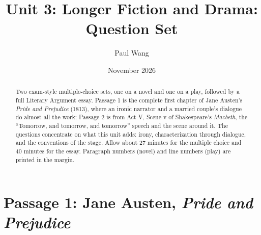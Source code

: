 \documentclass[11pt]{article}
\title{Unit 3: Longer Fiction and Drama: Question Set}
\author{Paul Wang}
\date{November 2026}
\begin{document}
\maketitle

\begin{abstract}
Two exam-style multiple-choice sets, one on a novel and one on a play, followed by a full Literary Argument essay. Passage 1 is the complete first chapter of Jane Austen's \emph{Pride and Prejudice} (1813), where an ironic narrator and a married couple's dialogue do almost all the work; Passage 2 is from Act V, Scene v of Shakespeare's \emph{Macbeth}, the ``Tomorrow, and tomorrow, and tomorrow'' speech and the scene around it. The questions concentrate on what this unit adds: irony, characterization through dialogue, and the conventions of the stage. Allow about 27 minutes for the multiple choice and 40 minutes for the essay. Paragraph numbers (novel) and line numbers (play) are printed in the margin.
\end{abstract}


\section{Passage 1: Jane Austen, \emph{Pride and Prejudice}}
\end{document}
